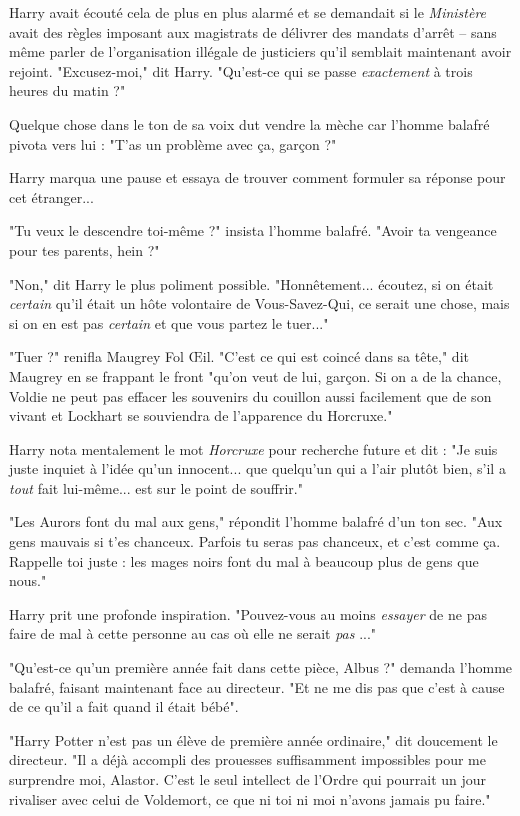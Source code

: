 Harry avait écouté cela de plus en plus alarmé et se demandait si le \emph{Ministère}  avait des règles imposant aux magistrats de délivrer des mandats d'arrêt – sans même parler de l'organisation illégale de justiciers qu'il semblait maintenant avoir rejoint. "Excusez-moi," dit Harry. "Qu'est-ce qui se passe \emph{exactement}  à trois heures du matin ?"

Quelque chose dans le ton de sa voix dut vendre la mèche car l'homme balafré pivota vers lui : "T'as un problème avec ça, garçon ?"

Harry marqua une pause et essaya de trouver comment formuler sa réponse pour cet étranger...

"Tu veux le descendre toi-même ?" insista l'homme balafré. "Avoir ta vengeance pour tes parents, hein ?"

"Non," dit Harry le plus poliment possible. "Honnêtement... écoutez, si on était \emph{certain}  qu'il était un hôte volontaire de Vous-Savez-Qui, ce serait une chose, mais si on en est pas \emph{certain } et que vous partez le tuer..."

"Tuer ?" renifla Maugrey Fol Œil. "C'est ce qui est coincé dans sa tête," dit Maugrey en se frappant le front "qu'on veut de lui, garçon. Si on a de la chance, Voldie ne peut pas effacer les souvenirs du couillon aussi facilement que de son vivant et Lockhart se souviendra de l'apparence du Horcruxe."

Harry nota mentalement le mot \emph{Horcruxe}  pour recherche future et dit : "Je suis juste inquiet à l'idée qu'un innocent... que quelqu'un qui a l'air plutôt bien, s'il a \emph{tout}  fait lui-même... est sur le point de souffrir."

"Les Aurors font du mal aux gens," répondit l'homme balafré d'un ton sec. "Aux gens mauvais si t'es chanceux. Parfois tu seras pas chanceux, et c'est comme ça. Rappelle toi juste : les mages noirs font du mal à beaucoup plus de gens que nous."

Harry prit une profonde inspiration. "Pouvez-vous au moins \emph{essayer}  de ne pas faire de mal à cette personne au cas où elle ne serait \emph{pas} ..."

"Qu'est-ce qu'un première année fait dans cette pièce, Albus ?" demanda l'homme balafré, faisant maintenant face au directeur. "Et ne me dis pas que c'est à cause de ce qu'il a fait quand il était bébé".

"Harry Potter n'est pas un élève de première année ordinaire," dit doucement le directeur. "Il a déjà accompli des prouesses suffisamment impossibles pour me surprendre moi, Alastor. C'est le seul intellect de l'Ordre qui pourrait un jour rivaliser avec celui de Voldemort, ce que ni toi ni moi n'avons jamais pu faire."

